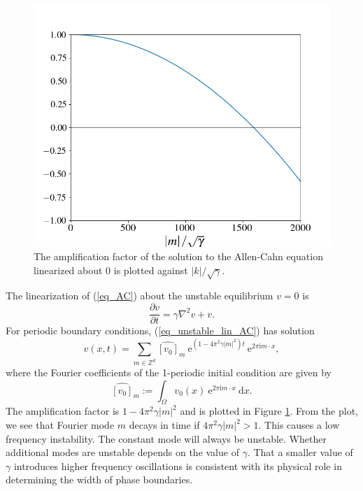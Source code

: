 \documentclass[12pt, reqno]{report}
\theoremstyle{definition}
\theoremstyle{remark}
\newcommand{\ud}{\mathrm{d}}
\newcommand{\e}{\mathrm{e}}
\renewcommand{\i}{\mathrm{i}}
\begin{document}
\begin{figure}
    \centering

    \vspace*{-19pt}
    \includegraphics[width = .3\paperwidth]{media_paper/lin_AC_amp.png}

    \caption{The amplification factor of the solution to the Allen-Cahn equation linearized about 0 is plotted against $|k|/\sqrt{\gamma}$.}
    \vspace{-10pt}
    \label{fg_AC_amp_DE}
\end{figure}
The linearization of (\ref{eq_AC}) about the unstable equilibrium $v=0$ is 
\begin{equation} \label{eq_unstable_lin_AC}
    \frac{\partial v}{\partial t}=\gamma\nabla ^{2}v+v.
\end{equation}
For periodic boundary conditions, (\ref{eq_unstable_lin_AC}) has solution 
\begin{equation}
    v(x,t)=\sum_{m\in\mathbb{Z}^{d}}\widehat{[v_{0}]}_{m}~\e^{(1-4\pi^{2}\gamma|m|^{2})t}~\e^{2\pi\i m\cdot x},
\end{equation}
where the Fourier coefficients of the 1-periodic initial condition are given by 
\begin{equation} \label{eq_FC}
    \widehat{[v_{0}]}_{m}:=\int_{\Omega}v_{0}(x)~\e^{2\pi \i m\cdot x}~\ud x.
\end{equation}
The amplification factor is $1-4\pi^2\gamma|m|^2$ and is plotted in Figure \ref{fg_AC_amp_DE}. 
From the plot, we see that Fourier mode $m$ decays in time if $4\pi^{2}\gamma|m|^{2}>1$. This causes a low frequency instability. %
The constant mode will always be unstable. 
Whether additional modes are unstable depends on the value of $\gamma$. 
That a smaller value of $\gamma$ introduces higher frequency oscillations is consistent with its physical role in determining the width of phase boundaries. 
    
\end{document}

